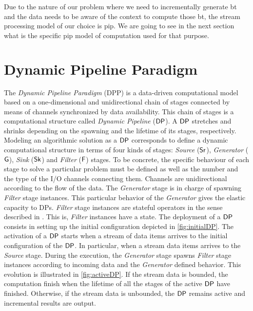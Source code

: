 Due to the nature of our problem where we need to incrementally generate \acrlong{bt} and the data needs to be aware of the context to compute those \acrshort{bt}, the stream processing model of our choice is \acrshort{pip}.
We are going to see in the next section what is the specific \acrshort{pip} model of computation used for that purpose.

\section{Dynamic Pipeline Paradigm}
The \textit{Dynamic Pipeline Paradigm} (DPP) \cite{dpdef} is a data-driven computational model  based on a one-dimensional and unidirectional chain of stages connected by means of channels synchronized by data availability. 
This chain of stages is a computational structure called \textit{Dynamic Pipeline} ($\mathsf{DP}$). A $\mathsf{DP}$ stretches and shrinks depending on the spawning and the lifetime of its stages, respectively. Modeling an algorithmic 
solution as a $\mathsf{DP}$ corresponds to define a dynamic computational structure  in terms of four kinds of stages:  \textit{Source} ($\mathsf{Sr}$),  \textit{Generator} ($\mathsf{G}$),  \textit{Sink} ($\mathsf{Sk}$) and \textit{Filter} ($\mathsf{F}$) stages. 
To be concrete, the specific  behaviour of each stage to solve a particular problem must be defined as well as the number and the type of the I/O channels connecting them. Channels are unidirectional according to the flow of the data. 
The \textit{Generator} stage is in charge of spawning \textit{Filter} stage instances. This particular behavior of the \textit{Generator}  gives the elastic capacity to DPs. \textit{Filter} stage instances are stateful operators in the 
sense described in \cite{HR19}. This is, \textit{Filter} instances have a state.  
The deployment of a $\mathsf{DP}$ consists in setting up the initial configuration depicted in \autoref{fig:initialDP}. The activation of a $\mathsf{DP}$ starts when a stream of data items arrives to the initial configuration of the $\mathsf{DP}$. 
In particular, when a stream data items arrives to the \textit{Source} stage. During the execution, the  \textit{Generator} stage spawns \textit{Filter} stage instances according to incoming data and the \textit{Generator} defined behavior. 
This evolution is illustrated in  \autoref{fig:activeDP}. If the stream  data is bounded, the computation finish when the lifetime of all the stages of the active $\mathsf{DP}$ have finished. Otherwise, if the stream data is unbounded, 
the $\mathsf{DP}$ remains active and incremental results are output. 

